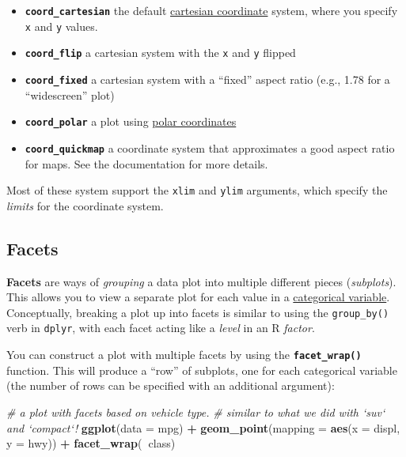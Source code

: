\documentclass[]{book}
\newenvironment{Shaded}{\begin{snugshade}}{\end{snugshade}}
\newcommand{\KeywordTok}[1]{\textcolor[rgb]{0.13,0.29,0.53}{\textbf{#1}}}
\newcommand{\DataTypeTok}[1]{\textcolor[rgb]{0.13,0.29,0.53}{#1}}
\newcommand{\StringTok}[1]{\textcolor[rgb]{0.31,0.60,0.02}{#1}}
\newcommand{\CommentTok}[1]{\textcolor[rgb]{0.56,0.35,0.01}{\textit{#1}}}
\newcommand{\OperatorTok}[1]{\textcolor[rgb]{0.81,0.36,0.00}{\textbf{#1}}}
\newcommand{\NormalTok}[1]{#1}
\providecommand{\tightlist}{%
  \setlength{\itemsep}{0pt}\setlength{\parskip}{0pt}}
\theoremstyle{definition}
\theoremstyle{definition}
\theoremstyle{remark}
\begin{document}
\begin{itemize}
\tightlist
\item
  \textbf{\texttt{coord\_cartesian}} the default
  \href{https://en.wikipedia.org/wiki/Cartesian_coordinate_system}{cartesian
  coordinate} system, where you specify \texttt{x} and \texttt{y}
  values.
\item
  \textbf{\texttt{coord\_flip}} a cartesian system with the \texttt{x}
  and \texttt{y} flipped
\item
  \textbf{\texttt{coord\_fixed}} a cartesian system with a ``fixed''
  aspect ratio (e.g., 1.78 for a ``widescreen'' plot)
\item
  \textbf{\texttt{coord\_polar}} a plot using
  \href{https://en.wikipedia.org/wiki/Polar_coordinate_system}{polar
  coordinates}
\item
  \textbf{\texttt{coord\_quickmap}} a coordinate system that
  approximates a good aspect ratio for maps. See the documentation for
  more details.
\end{itemize}

Most of these system support the \texttt{xlim} and \texttt{ylim}
arguments, which specify the \emph{limits} for the coordinate system.

\subsection{Facets}\label{facets}

\textbf{Facets} are ways of \emph{grouping} a data plot into multiple
different pieces (\emph{subplots}). This allows you to view a separate
plot for each value in a
\href{https://en.wikipedia.org/wiki/Categorical_variable}{categorical
variable}. Conceptually, breaking a plot up into facets is similar to
using the \texttt{group\_by()} verb in \texttt{dplyr}, with each facet
acting like a \emph{level} in an R \emph{factor}.

You can construct a plot with multiple facets by using the
\textbf{\texttt{facet\_wrap()}} function. This will produce a ``row'' of
subplots, one for each categorical variable (the number of rows can be
specified with an additional argument):

\begin{Shaded}
\begin{Highlighting}[]
\CommentTok{# a plot with facets based on vehicle type.}
\CommentTok{# similar to what we did with `suv` and `compact`!}
\KeywordTok{ggplot}\NormalTok{(}\DataTypeTok{data =}\NormalTok{ mpg) }\OperatorTok{+}
\StringTok{  }\KeywordTok{geom_point}\NormalTok{(}\DataTypeTok{mapping =} \KeywordTok{aes}\NormalTok{(}\DataTypeTok{x =}\NormalTok{ displ, }\DataTypeTok{y =}\NormalTok{ hwy)) }\OperatorTok{+}
\StringTok{  }\KeywordTok{facet_wrap}\NormalTok{(}\OperatorTok{~}\NormalTok{class)}
\end{Highlighting}
\end{Shaded}
\end{document}
